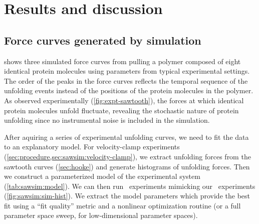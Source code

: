 \section{Results and discussion}
\label{sec:sawsim:results}

\subsection{Force curves generated by simulation}
\label{sec:sawsim:results:force-curves}

 shows three simulated force curves from
pulling a polymer composed of eight identical protein molecules using
parameters from typical experimental settings.  The order of the peaks
in the force curves reflects the temporal sequence of the unfolding
events instead of the positions of the protein molecules in the
polymer\citep{li00}.  As observed experimentally
(\cref{fig:expt-sawtooth}), the forces at which identical protein
molecules unfold fluctuate, revealing the stochastic nature of protein
unfolding since no instrumental noise is included in the simulation.

After aquiring a series of experimental unfolding curves, we need to
fit the data to an explanatory model.  For velocity-clamp experiments
(\cref{sec:procedure,sec:sawsim:velocity-clamp}), we extract unfolding
forces from the sawtooth curves (\cref{sec:hooke}) and generate
histograms of unfolding forces.  Then we construct a parameterized
model of the experimental system (\cref{tab:sawsim:model}).  We can
then run \insilico\ experiments mimicking our \invitro\ experiments
(\cref{fig:sawsim:sim-hist}).  We extract the model parameters which
provide the best fit using a ``fit quality'' metric and a nonlinear
optimization routine (or a full parameter space sweep, for
low-dimensional parameter spaces).


